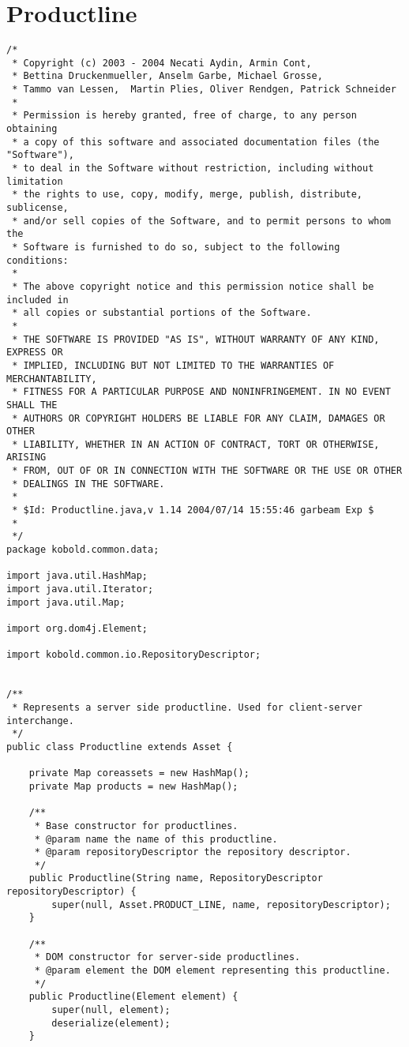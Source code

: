 \section{Productline}
\small \begin{verbatim}
/*
 * Copyright (c) 2003 - 2004 Necati Aydin, Armin Cont, 
 * Bettina Druckenmueller, Anselm Garbe, Michael Grosse, 
 * Tammo van Lessen,  Martin Plies, Oliver Rendgen, Patrick Schneider
 * 
 * Permission is hereby granted, free of charge, to any person obtaining
 * a copy of this software and associated documentation files (the "Software"),
 * to deal in the Software without restriction, including without limitation
 * the rights to use, copy, modify, merge, publish, distribute, sublicense, 
 * and/or sell copies of the Software, and to permit persons to whom the 
 * Software is furnished to do so, subject to the following conditions:
 *
 * The above copyright notice and this permission notice shall be included in 
 * all copies or substantial portions of the Software.
 *
 * THE SOFTWARE IS PROVIDED "AS IS", WITHOUT WARRANTY OF ANY KIND, EXPRESS OR 
 * IMPLIED, INCLUDING BUT NOT LIMITED TO THE WARRANTIES OF MERCHANTABILITY, 
 * FITNESS FOR A PARTICULAR PURPOSE AND NONINFRINGEMENT. IN NO EVENT SHALL THE 
 * AUTHORS OR COPYRIGHT HOLDERS BE LIABLE FOR ANY CLAIM, DAMAGES OR OTHER 
 * LIABILITY, WHETHER IN AN ACTION OF CONTRACT, TORT OR OTHERWISE, ARISING 
 * FROM, OUT OF OR IN CONNECTION WITH THE SOFTWARE OR THE USE OR OTHER 
 * DEALINGS IN THE SOFTWARE.
 *
 * $Id: Productline.java,v 1.14 2004/07/14 15:55:46 garbeam Exp $
 *
 */
package kobold.common.data;

import java.util.HashMap;
import java.util.Iterator;
import java.util.Map;

import org.dom4j.Element;

import kobold.common.io.RepositoryDescriptor;


/**
 * Represents a server side productline. Used for client-server interchange.
 */
public class Productline extends Asset {

	private Map coreassets = new HashMap();
	private Map products = new HashMap();
	
	/**
	 * Base constructor for productlines.
	 * @param name the name of this productline.
	 * @param repositoryDescriptor the repository descriptor.
	 */
	public Productline(String name, RepositoryDescriptor repositoryDescriptor) {
		super(null, Asset.PRODUCT_LINE, name, repositoryDescriptor);
	}

	/**
	 * DOM constructor for server-side productlines.
	 * @param element the DOM element representing this productline.
	 */
	public Productline(Element element) {
		super(null, element);
		deserialize(element);
	}


\end{verbatim}
